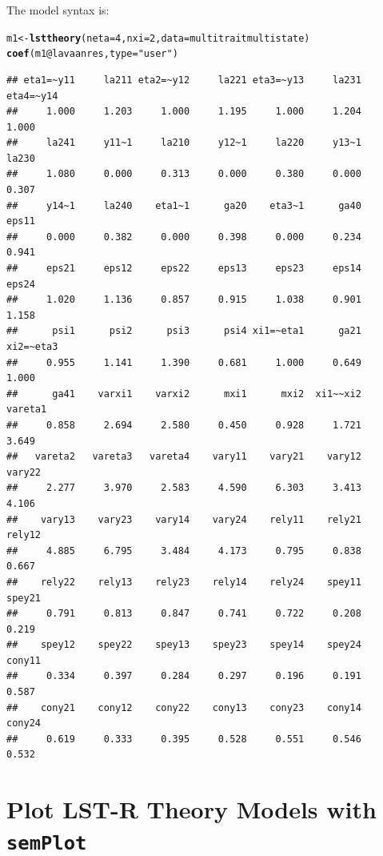 \documentclass[10pt]{article}\usepackage{graphicx, color}
\makeatletter
\newcommand{\hlfunctioncall}[1]{\textcolor[rgb]{0.501960784313725,0,0.329411764705882}{\textbf{#1}}}%
\newcommand{\hlstring}[1]{\textcolor[rgb]{0.6,0.6,1}{#1}}%
\newenvironment{kframe}{%
 \def\at@end@of@kframe{}%
 \ifinner\ifhmode%
  \def\at@end@of@kframe{\end{minipage}}%
  \begin{minipage}{\columnwidth}%
 \fi\fi%
 \def\FrameCommand##1{\hskip\@totalleftmargin \hskip-\fboxsep
 \colorbox{shadecolor}{##1}\hskip-\fboxsep
     \hskip-\linewidth \hskip-\@totalleftmargin \hskip\columnwidth}%
 \MakeFramed {\advance\hsize-\width
   \@totalleftmargin\z@ \linewidth\hsize
   \@setminipage}}%
 {\par\unskip\endMakeFramed%
 \at@end@of@kframe}
\newenvironment{knitrout}{}{} %
\makeatother
\begin{document}
The model syntax is:

%
\begin{knitrout}
\color{fgcolor}\begin{kframe}
\begin{alltt}
m1 <- \hlfunctioncall{lsttheory}(neta = 4, nxi = 2, data = multitraitmultistate)
\hlfunctioncall{coef}(m1@lavaanres, type = \hlstring{"user"})
\end{alltt}
\begin{verbatim}
## eta1=~y11     la211 eta2=~y12     la221 eta3=~y13     la231 eta4=~y14 
##     1.000     1.203     1.000     1.195     1.000     1.204     1.000 
##     la241     y11~1     la210     y12~1     la220     y13~1     la230 
##     1.080     0.000     0.313     0.000     0.380     0.000     0.307 
##     y14~1     la240    eta1~1      ga20    eta3~1      ga40     eps11 
##     0.000     0.382     0.000     0.398     0.000     0.234     0.941 
##     eps21     eps12     eps22     eps13     eps23     eps14     eps24 
##     1.020     1.136     0.857     0.915     1.038     0.901     1.158 
##      psi1      psi2      psi3      psi4 xi1=~eta1      ga21 xi2=~eta3 
##     0.955     1.141     1.390     0.681     1.000     0.649     1.000 
##      ga41    varxi1    varxi2      mxi1      mxi2  xi1~~xi2   vareta1 
##     0.858     2.694     2.580     0.450     0.928     1.721     3.649 
##   vareta2   vareta3   vareta4    vary11    vary21    vary12    vary22 
##     2.277     3.970     2.583     4.590     6.303     3.413     4.106 
##    vary13    vary23    vary14    vary24    rely11    rely21    rely12 
##     4.885     6.795     3.484     4.173     0.795     0.838     0.667 
##    rely22    rely13    rely23    rely14    rely24    spey11    spey21 
##     0.791     0.813     0.847     0.741     0.722     0.208     0.219 
##    spey12    spey22    spey13    spey23    spey14    spey24    cony11 
##     0.334     0.397     0.284     0.297     0.196     0.191     0.587 
##    cony21    cony12    cony22    cony13    cony23    cony14    cony24 
##     0.619     0.333     0.395     0.528     0.551     0.546     0.532
\end{verbatim}
\end{kframe}
\end{knitrout}

%

\newpage

\section{Plot LST-R Theory Models with \texttt{semPlot}}
\end{document}
